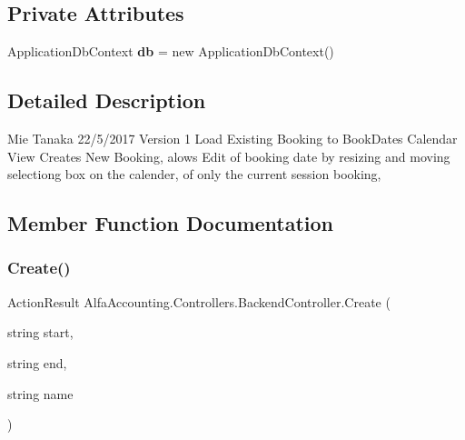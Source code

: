 \subsection*{Private Attributes}
\begin{DoxyCompactItemize}
\item 
\mbox{\label{class_alfa_accounting_1_1_controllers_1_1_backend_controller_a3cb23939097b665268f8aca8a960edc9}} 
Application\+Db\+Context {\bfseries db} = new Application\+Db\+Context()
\end{DoxyCompactItemize}


\subsection{Detailed Description}
Mie Tanaka 22/5/2017 Version 1 Load Existing Booking to Book\+Dates Calendar View Creates New Booking, alows Edit of booking date by resizing and moving selectiong box on the calender, of only the current session booking, 



\subsection{Member Function Documentation}
\mbox{\label{class_alfa_accounting_1_1_controllers_1_1_backend_controller_a49fa4ed8afd915ec1fc3fdb15648df79}} 
\subsubsection{\texorpdfstring{Create()}{Create()}}
{\footnotesize\ttfamily Action\+Result Alfa\+Accounting.\+Controllers.\+Backend\+Controller.\+Create (\begin{DoxyParamCaption}\item[{string}]{start,  }\item[{string}]{end,  }\item[{string}]{name }\end{DoxyParamCaption})}



